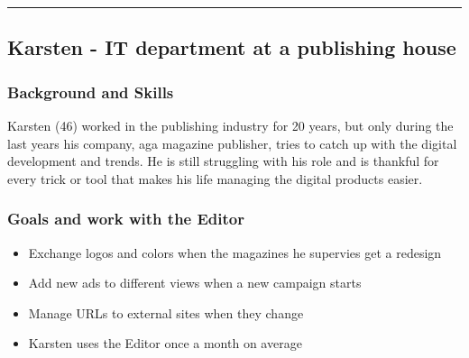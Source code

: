 \hrule
\subsection{Karsten - IT department at a publishing house}
\subsubsection{Background and Skills}
Karsten (46) worked in the publishing industry for 20 years, but only during the last years his company, aga magazine publisher, tries to catch up with the digital development and trends. He is still struggling with his role and is thankful for every trick or tool that makes his life managing the digital products easier.
\\
\subsubsection{Goals and work with the Editor}
\begin{itemize}
  \item Exchange logos and colors when the magazines he supervies get a redesign
  \item Add new ads to different views when a new campaign starts
  \item Manage URLs to external sites when they change
  \item Karsten uses the Editor once a month on average
\end{itemize}
